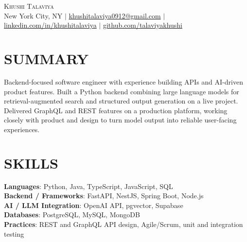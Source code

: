 \documentclass[letterpaper,11pt]{article}
\begin{document}
\begin{center}
    {\Huge \scshape Khushi Talaviya} \\ \vspace{2pt}
    \vspace{4pt}
    \small
    New York City, NY $|$
    \href{mailto:khushitalaviya0912@gmail.com}{khushitalaviya0912@gmail.com} $|$
    \href{https://www.linkedin.com/in/khushitalaviya/}{linkedin.com/in/khushitalaviya} $|$
    \href{https://github.com/talaviyakhushi}{github.com/talaviyakhushi}
\end{center}

\section{SUMMARY}
\vspace{5pt}
\small{Backend-focused software engineer with experience building APIs and AI-driven product features. Built a Python backend combining large language models for retrieval-augmented search and structured output generation on a live project. Delivered GraphQL and REST features on a production platform, working closely with product and design to turn model output into reliable user-facing experiences.}

\vspace{2pt}
\section{SKILLS}
\vspace{5pt}
\begin{itemize}[leftmargin=0in, label={}]
\small{\item{
\textbf{Languages}{: Python, Java, TypeScript, JavaScript, SQL} \\
\textbf{Backend / Frameworks}{: FastAPI, NestJS, Spring Boot, Node.js} \\
\textbf{AI / LLM Integration}{: OpenAI API, pgvector, Supabase} \\
\textbf{Databases}{: PostgreSQL, MySQL, MongoDB} \\
\textbf{Practices}{: REST and GraphQL API design, Agile/Scrum, unit and integration testing}
}}
\end{itemize}
\vspace{-10pt}

\end{document}
